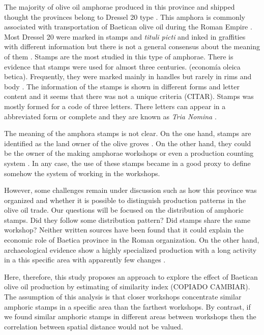 \documentclass[review]{elsarticle}
\begin{document}
The majority of olive oil amphorae produced in this province and shipped thought the provinces belong to Dressel 20 type \citep{dressel,martin-kilcher_romischen_1994}. This amphora is commonly associated with transportation of Baetican olive oil during the Roman Empire \citep{berni_millet_epigrafianforica_2008}. Most Dressel 20 were marked in stamps and \textit{tituli picti} and inked in graffities with different information but there is not a general consensus about the meaning of them \citep{rodriguez_baetican_1998}. Stamps are the most studied in this type of amphorae. There is evidence that stamps were used for almost three centuries. (economía oleica betica). Frequently, they were marked mainly in handles but rarely in rims and body \citep{millet_anforas_1998}. 
The information of the stamps is shown in different forms and letter content and it seems that there was not a unique criteria (CITAR). Stamps was mostly formed for a code of three letters. There letters can appear in a abbreviated form or complete and they are known as \textit{Tria Nomina} \citep{berni_millet_amphora_1996}. 

The meaning of the amphora stamps is not clear. On the one hand, stamps are identified as the land owner of the olive groves \citep{rodriguez_economioleicola_1977}. On the other hand, they could be the owner of the making amphorae workshops or even a production counting system  \citep{berni_millet_epigrafianforica_2008}. In any case, the use of these stamps became in a good proxy to define somehow the system of working in the workshops. 


However, some challenges remain under discussion such as how this province was organized and whether it is possible to distinguish production patterns in the olive oil trade. Our questions will be focused on the distribution of amphoric stamps. Did they follow some distribution pattern? Did stamps share the same workshop? Neither written sources have been found that it could explain the economic role of Baetica province in the Roman organization. On the other hand, archaeological evidence show a highly specialized production with a long activity in a this specific area with apparently few changes \citep{remesal_anforas_2004}. 


Here, therefore, this study proposes an approach to explore the effect of Baetican olive oil production by estimating of similarity index (COPIADO CAMBIAR). The assumption of this analysis is that closer workshops concentrate similar amphoric stamps in a specific area than the farthest workshops. By contrast, if we found similar amphoric stamps in different areas between workshops then the correlation between spatial distance would not be valued.  
\end{document}
